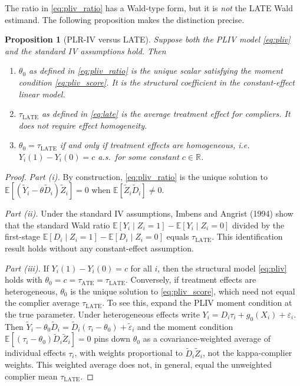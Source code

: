 \documentclass[12pt,a4paper]{article}
\newtheorem{proposition}{Proposition}
\newcommand{\E}{\mathbb{E}}
\newcommand{\tY}{\widetilde{Y}}
\newcommand{\tD}{\widetilde{D}}
\newcommand{\tZ}{\widetilde{Z}}
\begin{document}
The ratio in \eqref{eq:pliv_ratio} has a Wald-type form, but it is \emph{not} the LATE
Wald estimand.  The following proposition makes the distinction precise.

\begin{proposition}[PLR-IV versus LATE]
\label{prop:pliv_late}
Suppose both the PLIV model \eqref{eq:pliv} and the standard IV assumptions hold.
Then
\begin{enumerate}
  \item[\normalfont(i)] $\theta_0$ as defined in \eqref{eq:pliv_ratio} is the unique
        scalar satisfying the moment condition \eqref{eq:pliv_score}.  It is the
        structural coefficient in the constant-effect linear model.
  \item[\normalfont(ii)] $\tau_{\mathrm{LATE}}$ as defined in \eqref{eq:late} is the
        average treatment effect for compliers.  It does not require effect homogeneity.
  \item[\normalfont(iii)] $\theta_0 = \tau_{\mathrm{LATE}}$ if and only if treatment
        effects are homogeneous, i.e.\ $Y_i(1)-Y_i(0)=c$ a.s.\ for some constant
        $c\in\mathbb{R}$.
\end{enumerate}
\end{proposition}

\begin{proof}
\textit{Part (i).}  By construction, \eqref{eq:pliv_ratio} is the unique solution to
$\E[(\tY_i-\theta\tD_i)\tZ_i]=0$ when $\E[\tZ_i\tD_i]\neq 0$.

\textit{Part (ii).}  Under the standard IV assumptions, Imbens and Angrist (1994) show
that the standard Wald ratio $\E[Y_i\mid Z_i=1]-\E[Y_i\mid Z_i=0]$ divided by the
first-stage $\E[D_i\mid Z_i=1]-\E[D_i\mid Z_i=0]$ equals $\tau_{\mathrm{LATE}}$.  This
identification result holds without any constant-effect assumption.

\textit{Part (iii).}  If $Y_i(1)-Y_i(0)=c$ for all $i$, then the structural model
\eqref{eq:pliv} holds with $\theta_0=c=\tau_{\mathrm{ATE}}=\tau_{\mathrm{LATE}}$.
Conversely, if treatment effects are heterogeneous, $\theta_0$ is the unique solution to
\eqref{eq:pliv_score}, which need not equal the complier average $\tau_{\mathrm{LATE}}$.
To see this, expand the PLIV moment condition at the true parameter.  Under
heterogeneous effects write $Y_i=D_i\tau_i+g_0(X_i)+\varepsilon_i$.  Then
$\tY_i-\theta_0\tD_i=\tD_i(\tau_i-\theta_0)+\tilde\varepsilon_i$ and the moment
condition $\E[(\tau_i-\theta_0)\tD_i\tZ_i]=0$ pins down $\theta_0$ as a
covariance-weighted average of individual effects $\tau_i$, with weights proportional to
$\tD_i\tZ_i$, not the kappa-complier weights.  This weighted average does not, in
general, equal the unweighted complier mean $\tau_{\mathrm{LATE}}$.
\end{proof}
\end{document}

